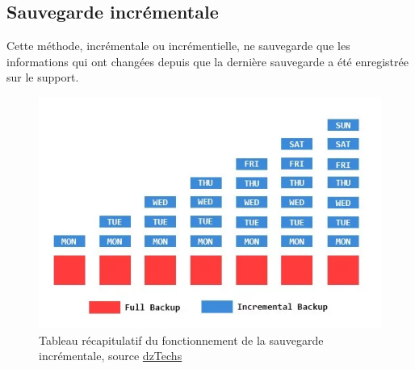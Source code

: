 \documentclass[pfe]{tnreport} %
\begin{document}
\subsection{Sauvegarde incrémentale}

Cette méthode, incrémentale ou incrémentielle, ne sauvegarde que les informations qui ont changées depuis que la dernière sauvegarde a été enregistrée sur le support. \newline
\begin{figure}[ht]
 \centering
 \includegraphics[width=15cm]{figures/incremental.png}
 \caption{Tableau récapitulatif du fonctionnement de la sauvegarde incrémentale, source
 \href{https://all-it-network.com/types-sauvegarde/}{dzTechs}}
 \label{fig:incrementale}
\end{figure}
\end{document}
